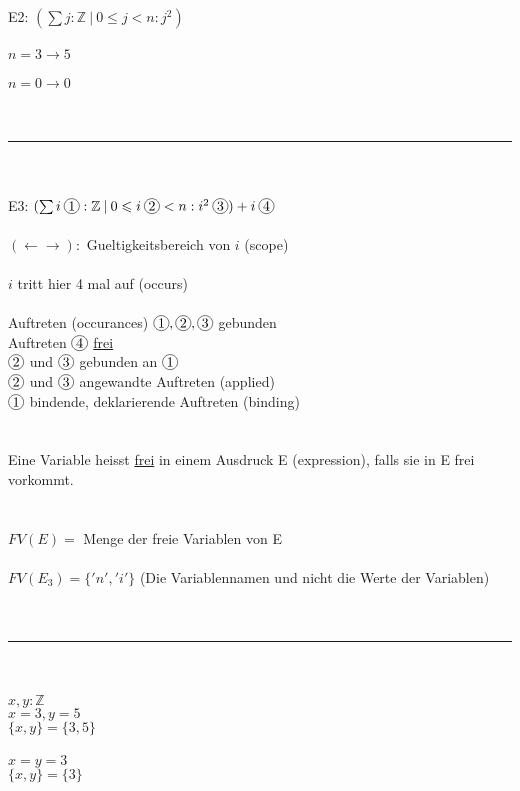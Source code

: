 \documentclass[18pt,a4paper]{article}
\newcommand*\circled[1]{\tikz[baseline=(char.base)]{
            \node[shape=circle,draw,inner sep=1pt] (char) {#1};}}
\newcommand{\tab}{\hspace*{2em}}
\begin{document}
E2: \tab$(\sum{j} : \mathbb{Z} \:\vert\: 0\leqslant j < n : j^2 )$\\
\\
$n = 3 \rightarrow 5$\\
\\
$n = 0 \rightarrow 0$\\
\\
\\
\rule{\textwidth}{0.4mm}\\
\\
E3: $(\sum{i} \:\circled{1} : \mathbb{Z} \:\vert\: 0\leqslant i \:\circled{2} < n : i^2 \:\circled{3} ) + i \:\circled{4}$\\
\\
$(\leftarrow \rightarrow) :$ Gueltigkeitsbereich von $i$ (scope)\\
\\
$i$ tritt hier 4 mal auf (occurs)\\
\\
Auftreten (occurances) $\circled{1}, \circled{2}, \circled{3}$ gebunden\\
Auftreten $\circled{4}$ \uline{frei}\\
$\circled{2}$ und $\circled{3}$ gebunden an $\circled{1}$\\
$\circled{2}$ und $\circled{3}$ angewandte Auftreten (applied)\\
$\circled{1}$ bindende, deklarierende Auftreten (binding)\\
\\
\\
Eine Variable heisst \uline{frei} in einem Ausdruck E (expression), falls sie in E frei vorkommt.\\
\\
\\
$FV(E) =$ Menge der freie Variablen von E\\
\\
$FV(E_3) = \{'n', 'i'\}$ (Die Variablennamen und nicht die Werte der Variablen)\\
\\
\\
\rule{\textwidth}{0.4mm}\\
\\
$x, y : \mathbb{Z}$\\
$x = 3, y = 5$\\
$\{x, y\} = \{3, 5\}$\\
\\
$x = y = 3$\\
$\{x, y\} = \{3\}$\\
\\
\end{document}
